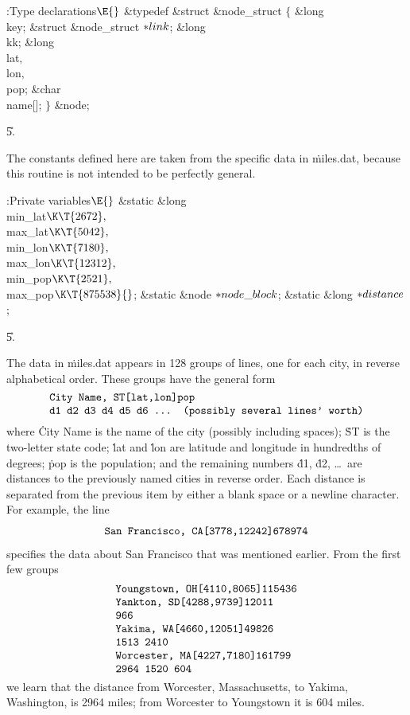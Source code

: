 \Y\B\4:Type declarations\X${}\E{}$\6
\&{typedef} \&{struct} \&{node\_struct} ${}\{{}$\1\6
\&{long} \\{key};\6
\&{struct} \&{node\_struct} ${}{*}\\{link}{}$;\6
\&{long} \\{kk};\6
\&{long} \\{lat}${},{}$ \\{lon}${},{}$ \\{pop};\6
\&{char} \\{name}[];\2\6
${}\}{}$ \&{node};\par
\U5.\fi

The constants defined here are taken from the specific data in %
\.{miles.dat},
because this routine is not intended to be perfectly general.

\Y\B\4:Private variables\X${}\E{}$\6
\&{static} \&{long} \\{min\_lat}${}\K\T{2672},{}$ \\{max\_lat}${}\K\T{5042},{}$
\\{min\_lon}${}\K\T{7180},{}$ \\{max\_lon}${}\K\T{12312},{}$ \\{min\_pop}${}\K%
\T{2521},{}$ \\{max\_pop}${}\K\T{875538}{}$;\6
\&{static} \&{node} ${}{*}\\{node\_block}{}$;\6
\&{static} \&{long} ${}{*}\\{distance}{}$;\par
\U5.\fi

The data in \.{miles.dat} appears in 128 groups of lines, one for each
city, in reverse alphabetical order. These groups have the general form
$$\vcenter{\halign{\tt#\hfil\cr
City Name, ST[lat,lon]pop\cr
d1 d2 d3 d4 d5 d6 ... (possibly several lines' worth)\cr
}}$$
where \.{City Name} is the name of the city (possibly including spaces);
\.{ST} is the two-letter state code; \.{lat} and \.{lon} are latitude
and longitude in hundredths of degrees; \.{pop} is the population; and
the remaining numbers \.{d1}, \.{d2}, \dots\ are distances to the
previously named cities in reverse order. Each distance is separated
from the previous item by either a blank space or a newline character.
For example, the line
$$\hbox{\tt San Francisco, CA[3778,12242]678974}$$
specifies the data about San Francisco that was mentioned earlier.
From the first few groups
$$\vcenter{\halign{\tt#\hfil\cr
Youngstown, OH[4110,8065]115436\cr
Yankton, SD[4288,9739]12011\cr
966\cr
Yakima, WA[4660,12051]49826\cr
1513 2410\cr
Worcester, MA[4227,7180]161799\cr
2964 1520 604\cr
}}$$
we learn that the distance from Worcester, Massachusetts, to Yakima,
Washington, is 2964 miles; from Worcester to Youngstown it is 604 miles.

